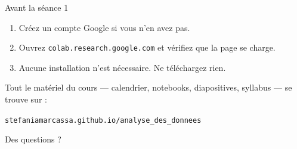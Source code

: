 \documentclass[10pt,aspectratio=169]{beamer}
\begin{document}
\begin{frame}{Avant la séance 1}
\begin{enumerate}
  \item Créez un compte Google si vous n'en avez pas.
  \item Ouvrez \texttt{colab.research.google.com} et vérifiez que la page se charge.
  \item Aucune installation n'est nécessaire. Ne téléchargez rien.
\end{enumerate}

\vspace{2em}
Tout le matériel du cours --- calendrier, notebooks, diapositives, syllabus --- se trouve sur :

\vspace{1em}
\begin{center}
\large \texttt{stefaniamarcassa.github.io/analyse\_des\_donnees}
\end{center}
\end{frame}

\begin{frame}[standout]
Des questions ?
\end{frame}
\end{document}
